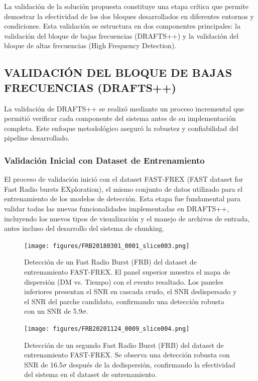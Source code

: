 
La validación de la solución propuesta constituye una etapa crítica que permite demostrar la efectividad de los dos bloques desarrollados en diferentes entornos y condiciones. Esta validación se estructura en dos componentes principales: la validación del bloque de bajas frecuencias (DRAFTS++) y la validación del bloque de altas frecuencias (High Frequency Detection).

\subsection{VALIDACIÓN DEL BLOQUE DE BAJAS FRECUENCIAS (DRAFTS++)}

La validación de DRAFTS++ se realizó mediante un proceso incremental que permitió verificar cada componente del sistema antes de su implementación completa. Este enfoque metodológico aseguró la robustez y confiabilidad del pipeline desarrollado.

\subsubsection{Validación Inicial con Dataset de Entrenamiento}

El proceso de validación inició con el dataset FAST-FREX (FAST dataset for Fast Radio bursts EXploration), el mismo conjunto de datos utilizado para el entrenamiento de los modelos de detección. Esta etapa fue fundamental para validar todas las nuevas funcionalidades implementadas en DRAFTS++, incluyendo los nuevos tipos de visualización y el manejo de archivos de entrada, antes incluso del desarrollo del sistema de chunking.

\begin{figure}[H]
    \centering
    \texttt{[image: figures/FRB20180301\_0001\_slice003.png]}
    \caption[Detección FRB (FAST-FREX)]{Detección de un Fast Radio Burst (FRB) del dataset de entrenamiento FAST-FREX. El panel superior muestra el mapa de dispersión (DM vs. Tiempo) con el evento resaltado. Los paneles inferiores presentan el SNR en cascada crudo, el SNR dedispersado y el SNR del parche candidato, confirmando una detección robusta con un SNR de 5.9$\sigma$.}
    \label{fig:frb20180301_0001_slice003}
\end{figure}

\begin{figure}[H]
    \centering
    \texttt{[image: figures/FRB20201124\_0009\_slice004.png]}
    \caption[Detección FRB adicional (FAST-FREX)]{Detección de un segundo Fast Radio Burst (FRB) del dataset de entrenamiento FAST-FREX. Se observa una detección robusta con SNR de 16.5$\sigma$ después de la dedispersión, confirmando la efectividad del sistema en el dataset de entrenamiento.}
    \label{fig:frb20201124_0009_slice004}
\end{figure}

